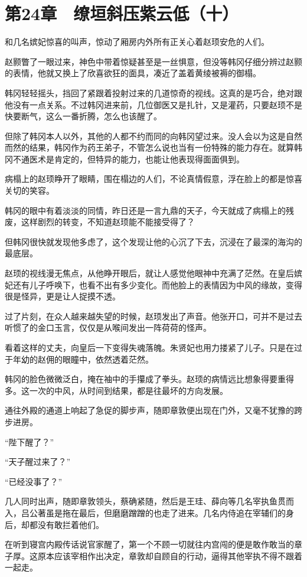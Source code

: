 \section{第24章　缭垣斜压紫云低（十）}

和几名嫔妃惊喜的叫声，惊动了厢房内外所有正关心着赵顼安危的人们。

赵颢瞥了一眼过来，神色中带着惊疑甚至是一丝惧意，但没等韩冈仔细分辨过赵颢的表情，他就又换上了欣喜欲狂的面具，凑近了盖着黄绫被褥的御榻。

韩冈轻轻摇头，挡回了紧跟着投射过来的几道惊奇的视线。这真的是巧合，绝对跟他没有一点关系。不过韩冈进来前，几位御医又是扎针，又是灌药，只要赵顼不是快要断气，这么一番折腾，怎么也该醒了。

但除了韩冈本人以外，其他的人都不约而同的向韩冈望过来。没人会以为这是自然而然的结果，韩冈作为药王弟子，不管怎么说也当有一份特殊的能力存在。就算韩冈不通医术是肯定的，但特异的能力，也能让他表现得面面俱到。

病榻上的赵顼睁开了眼睛，围在榻边的人们，不论真情假意，浮在脸上的都是惊喜关切的笑容。

韩冈的眼中有着淡淡的同情，昨日还是一言九鼎的天子，今天就成了病榻上的残废，这样剧烈的转变，不知道赵顼能不能接受得了？

但韩冈很快就发现他多虑了，这个发现让他的心沉了下去，沉浸在了最深的海沟的最底层。

赵顼的视线漫无焦点，从他睁开眼后，就让人感觉他眼神中充满了茫然。在皇后嫔妃还有儿子呼唤下，也看不出有多少变化。而他脸上的表情因为中风的缘故，变得很是怪异，更是让人捉摸不透。

过了片刻，在众人越来越失望的时候，赵顼发出了声音。他张开口，可并不是过去听惯了的金口玉言，仅仅是从喉间发出一阵荷荷的怪声。

看着这样的丈夫，向皇后一下变得失魂落魄。朱贤妃也用力搂紧了儿子。只是在过于年幼的赵佣的眼瞳中，依然透着茫然。

韩冈的脸色微微泛白，掩在袖中的手攥成了拳头。赵顼的病情远比想象得要重得多。这一次的中风，从时间到结果，都是往最坏的方向发展。

通往外殿的通道上响起了急促的脚步声，随即章敦便出现在门外，又毫不犹豫的跨步进房。

“陛下醒了？”

“天子醒过来了？”

“已经没事了？”

几人同时出声，随即章敦领头，蔡确紧随，然后是王珪、薛向等几名宰执鱼贯而入，吕公著虽是拖在最后，但磨磨蹭蹭的也走了进来。几名内侍追在宰辅们的身后，却都没有敢拦着他们。

在听到寝宫内殿传话说官家醒了，第一个不顾一切就往内宫闯的便是敢作敢当的章子厚。这原本应该宰相作出决定，章敦却自顾自的行动，逼得其他宰执不得不跟着一起走。

